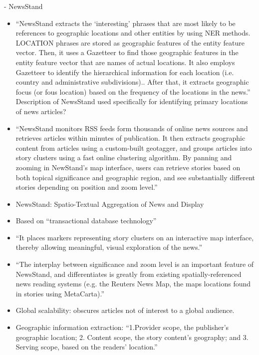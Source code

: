 - NewsStand
\begin{itemize}
	\item {\color{orange} “NewsStand extracts the ‘interesting’ phrases that are most likely to be references to geographic locations and other entities by using NER methods. LOCATION phrases are stored as geographic features of the entity feature vector. Then, it uses a Gazetteer to find those geographic features in the entity feature vector that are names of actual locations. It also employs  Gazetteer to identify the hierarchical information for each location (i.e. country and administrative subdivisions).. After that, it extracts geographic focus (or fous location) based on the frequency of the locations in the news.”  Description of NewsStand used specifically for identifying primary locations of news articles?\cite{Imani2019}}
	\item {\color{orange}“NewsStand monitors RSS feeds form thousands of online news sources and retrieves articles within minutes of publication. It then extracts geographic content from articles using a custom-built geotagger, and groups articles into story clusters using a fast online clustering algorithm. By panning and zooming in NewStand’s map interface, users can retrieve stories based on both topical significance and geographic region, and see substantially different stories depending on position and zoom level.”\cite{Teitler2008}}
	\item {\color{orange}NewsStand: Spatio-Textual Aggregation of News and Display \cite{Teitler2008}}
	\item {\color{orange}Based on ``transactional database technology'' \cite{Teitler2008}}
	\item {\color{orange} “It places markers representing story clusters on an interactive map interface, thereby allowing meaningful, visual exploration of the news.”\cite{Teitler2008}}
	\item {\color{orange} “The interplay between significance and zoom level is an important feature of NewsStand, and differentiates is greatly from existing spatially-referenced news reading systems (e.g. the Reuters News Map, the maps locations found in stories using MetaCarta).”\cite{Teitler2008}}
	\item {\color{orange} Global scalability: obscures articles not of interest to a global audience.\cite{Teitler2008}}
	\item {\color{orange} Geographic information extraction: “1.Provider scope, the publisher’s geographic location; 2. Content scope, the story content’s geography; and 3. Serving scope, based on the readers’ location.”\cite{Teitler2008}}

\end{itemize}
